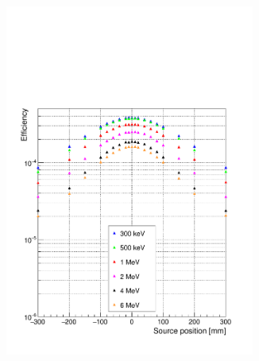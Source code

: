 \begin{figure} [!hbtp]	
\begin{subfigure}[b]{.5\textwidth}
\centering
\includegraphics[width=0.9\textwidth]{03_GraphicFiles/chapter4_HTsimu/new/EffVSpos_noCut_simple.pdf}
\caption{}
\label{chap4::fig::effPos_noCut}
\end{subfigure}
\begin{subfigure}[b]{.5\textwidth}
\centering

\end{subfigure}
\end{figure}
